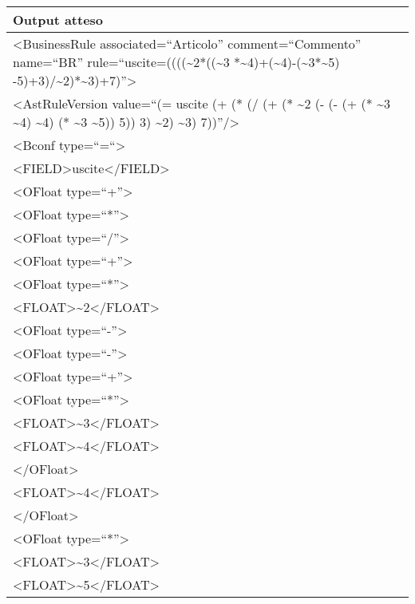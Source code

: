 \begin{center}
\begin{tabular}{|p{11cm}|} \hline
\textbf{Output atteso}\\ \hline
\textless BusinessRule associated=``Articolo'' comment=``Commento'' name=``BR'' rule=``uscite=((((\textasciitilde2*((\textasciitilde3 *\textasciitilde4)+(\textasciitilde4)-(\textasciitilde3*\textasciitilde5) -5)+3)/\textasciitilde2)*\textasciitilde3)+7)''\textgreater \\
\textless AstRuleVersion value=``(= uscite (+ (* (/ (+ (* \textasciitilde2 (- (- (+ (* \textasciitilde3 \textasciitilde4) \textasciitilde4) (* \textasciitilde3 \textasciitilde5)) 5)) 3) \textasciitilde2) \textasciitilde3) 7))''/\textgreater\\ 
\textless Bconf type=``=``\textgreater \\
\textless FIELD\textgreater uscite\textless /FIELD\textgreater \\
\textless OFloat type=``+''\textgreater \\
\textless OFloat type=``*''\textgreater \\
\textless OFloat type=``/''\textgreater \\
\textless OFloat type=``+''\textgreater \\
\textless OFloat type=``*''\textgreater \\
\textless FLOAT\textgreater \textasciitilde2\textless /FLOAT\textgreater \\
\textless OFloat type=``-''\textgreater \\
\textless OFloat type=``-''\textgreater \\
\textless OFloat type=``+''\textgreater \\
\textless OFloat type=``*''\textgreater \\
\textless FLOAT\textgreater \textasciitilde3\textless /FLOAT\textgreater \\
\textless FLOAT\textgreater \textasciitilde4\textless /FLOAT\textgreater \\
\textless /OFloat\textgreater \\
\textless FLOAT\textgreater \textasciitilde4\textless /FLOAT\textgreater \\
\textless /OFloat\textgreater \\
\textless OFloat type=``*''\textgreater \\
\textless FLOAT\textgreater \textasciitilde3\textless /FLOAT\textgreater \\
\textless FLOAT\textgreater \textasciitilde5\textless /FLOAT\textgreater \\

\end{tabular}
\end{center}
